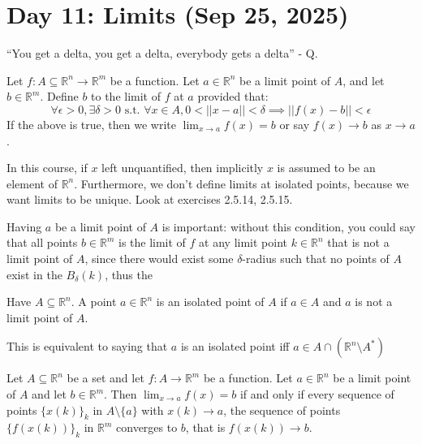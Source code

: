 \section{Day 11: Limits (Sep 25, 2025)}

``You get a delta, you get a delta, everybody gets a delta'' - Q.

\begin{definition}[Limit]
Let $f: A \subseteq \mathbb{R}^n \to \mathbb{R}^m$ be a function. Let $a \in \mathbb{R}^n$ be a limit point of $A$, and let $b \in \mathbb{R}^m$. Define $b$ to the limit of $f$ at $a$ provided that:
\[
    \forall \epsilon > 0, \exists \delta > 0 \text{ s.t. } \forall x \in A, 0 < ||x-a|| < \delta \implies ||f(x) - b|| < \epsilon 
\]
    If the above is true, then we write $\displaystyle \lim_{ x \to a } f(x) = b$ or say $f(x) \to b$ as $x \to a$. 
\end{definition}

\begin{remark}
In this course, if $x$ left unquantified, then implicitly $x$ is assumed to be an element of $\mathbb{R}^n$. Furthermore, we don't define limits at isolated points, because we want limits to be unique. Look at exercises 2.5.14, 2.5.15.
\end{remark}

Having $a$ be a limit point of $A$ is important: without this condition, you could say that all points $b \in \mathbb{R}^m$ is the limit of $f$ at any limit point $k \in \mathbb{R}^n$ that is not a limit point of $A$, since there would exist some $\delta$-radius such that no points of $A$ exist in the $B_ \delta(k)$, thus the 



\begin{definition}
Have $A \subseteq \mathbb{R}^n$. A point $a \in \mathbb{R}^n$ is an isolated point of $A$ if $a \in A$ and $a$ is not a limit point of $A$. 
\end{definition}

This is equivalent to saying that $a$ is an isolated point iff $a \in A \cap (\mathbb{R}^n \setminus A^*)$

\begin{theorem}
    Let $A \subseteq \mathbb{R}^n$ be a set and let $f: A \to \mathbb{R}^m$ be a function. Let $a \in \mathbb{R}^n$ be a limit point of $A$ and let $b \in \mathbb{R}^m$. Then $\displaystyle \lim_{ x \to a } f(x) = b$ if and only if every sequence of points $\{ x(k) \}_k$ in $A \setminus \{a\}$ with $x(k) \to a$, the sequence of points $\{ f(x(k)) \}_k$ in $\mathbb{R}^m$ converges to $b$, that is $f(x(k)) \to b$. 
\end{theorem}

